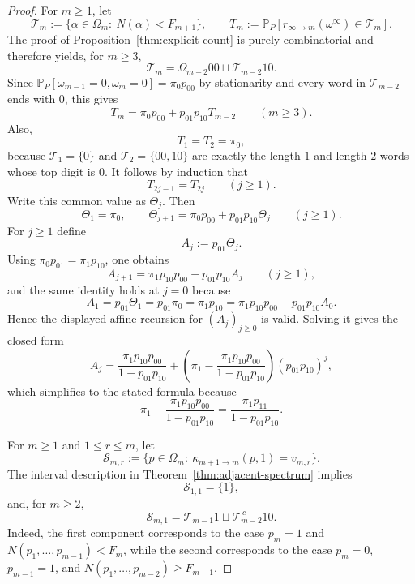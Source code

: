 \documentclass[11pt,reqno]{amsart}
\numberwithin{equation}{section}
\theoremstyle{plain}
\theoremstyle{definition}
\theoremstyle{remark}
\newcommand{\PP}{\mathbb{P}}
\begin{document}
\begin{proof}
For $m\ge 1$, let
\[
\mathcal{T}_m
:=
\{\alpha\in\Omega_m:\ N(\alpha)<F_{m+1}\},
\qquad
T_m:=\PP_P[r_{\infty\to m}(\omega^\infty)\in\mathcal{T}_m].
\]
The proof of Proposition~\ref{thm:explicit-count} is purely combinatorial and
therefore yields, for $m\ge 3$,
\[
\mathcal{T}_m=\Omega_{m-2}00\sqcup \mathcal{T}_{m-2}10.
\]
Since $\PP_P[\omega_{m-1}=0,\omega_m=0]=\pi_0p_{00}$ by stationarity and every
word in $\mathcal{T}_{m-2}$ ends with $0$, this gives
\[
T_m=\pi_0p_{00}+p_{01}p_{10}T_{m-2}
\qquad (m\ge 3).
\]
Also,
\[
T_1=T_2=\pi_0,
\]
because $\mathcal{T}_1=\{0\}$ and $\mathcal{T}_2=\{00,10\}$ are exactly the
length-$1$ and length-$2$ words whose top digit is $0$.  It follows by
induction that
\[
T_{2j-1}=T_{2j}
\qquad (j\ge 1).
\]
Write this common value as $\Theta_j$.  Then
\[
\Theta_1=\pi_0,
\qquad
\Theta_{j+1}=\pi_0p_{00}+p_{01}p_{10}\Theta_j
\qquad (j\ge 1).
\]
For $j\ge 1$ define
\[
A_j:=p_{01}\Theta_j.
\]
Using $\pi_0p_{01}=\pi_1p_{10}$, one obtains
\[
A_{j+1}=\pi_1p_{10}p_{00}+p_{01}p_{10}A_j
\qquad (j\ge 1),
\]
and the same identity holds at $j=0$ because
\[
A_1=p_{01}\Theta_1=p_{01}\pi_0=\pi_1p_{10}
=\pi_1p_{10}p_{00}+p_{01}p_{10}A_0.
\]
Hence the displayed affine recursion for $(A_j)_{j\ge 0}$ is valid.  Solving
it gives the closed form
\[
A_j
=
\frac{\pi_1p_{10}p_{00}}{1-p_{01}p_{10}}
+
\left(
\pi_1-\frac{\pi_1p_{10}p_{00}}{1-p_{01}p_{10}}
\right)
(p_{01}p_{10})^j,
\]
which simplifies to the stated formula because
\[
\pi_1-\frac{\pi_1p_{10}p_{00}}{1-p_{01}p_{10}}
=
\frac{\pi_1p_{11}}{1-p_{01}p_{10}}.
\]

For $m\ge 1$ and $1\le r\le m$, let
\[
\mathcal{S}_{m,r}
:=
\{p\in\Omega_m:\ \kappa_{m+1\to m}(p,1)=v_{m,r}\}.
\]
The interval description in Theorem~\ref{thm:adjacent-spectrum} implies
\[
\mathcal{S}_{1,1}=\{1\},
\]
and, for $m\ge 2$,
\[
\mathcal{S}_{m,1}
=
\mathcal{T}_{m-1}1
\sqcup
\mathcal{T}_{m-2}^{\,c}10.
\]
Indeed, the first component corresponds to the case $p_m=1$ and
$N(p_1,\dots,p_{m-1})<F_m$, while the second corresponds to the case $p_m=0$,
$p_{m-1}=1$, and $N(p_1,\dots,p_{m-2})\ge F_{m-1}$.


\end{proof}
\end{document}
